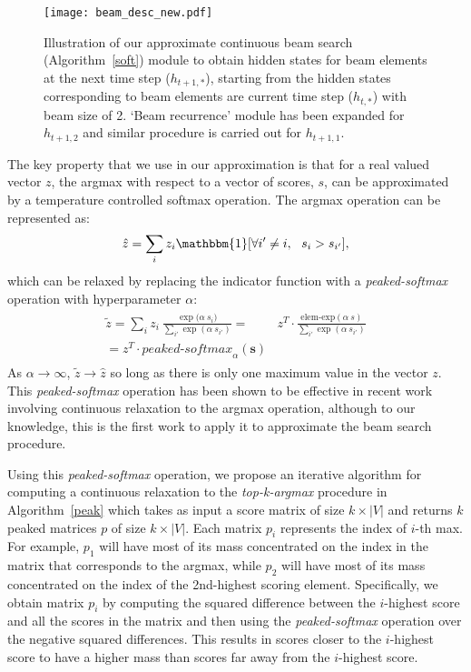 \documentclass[letterpaper]{article} %
\begin{document}
\begin{figure*}[t]
\centering
\texttt{[image: beam\_desc\_new.pdf]}
  \label{figmodel}
  \caption{Illustration of our approximate continuous beam search (Algorithm~\ref{soft}) module to obtain hidden states for beam elements at the next time step (${h_{t+1,*}}$), starting from the hidden states corresponding to beam elements are current time step ($h_{t,*}$) with beam size of 2. `Beam recurrence' module has been expanded for $h_{t+1,2}$ and similar procedure is carried out for $h_{t+1,1}$.}
\end{figure*}
The key property that we use in our approximation is that for a real valued vector $z$, the argmax with respect to a vector of scores, $s$, can be approximated by a temperature controlled softmax operation. The argmax operation can be represented as:
\begin{align*}
    \hat{z} = \sum_i z_i\mathbbm{1}[\forall i' \ne i,\ \ s_i > s_{i'}],
\end{align*}
which can be relaxed by replacing the indicator function with a \emph{peaked-softmax} operation with hyperparameter $\alpha$:
\begin{align*}
 \begin{split}
    \tilde{z} = \sum_i z_i~ \frac{\exp{(\alpha~ s_i})}{\sum_{i'} \exp{(\alpha~ s_{i'})}} = & z^T \cdot \frac{\textrm{elem-exp}(\alpha~ s)}{\sum_{i'} \exp{(\alpha~ s_{i'})}}\\= z^T \cdot \textit{peaked-softmax}_{\alpha}(\mathbf{s})
 \end{split}
\end{align*}
As $\alpha \to \infty$, $\tilde{z} \to \hat{z}$ so long as there is only one maximum value in the vector $z$. This \emph{peaked-softmax} operation has been shown to be effective in recent work \cite{maddison2016concrete,jang2016categorical,softgreedy} involving continuous relaxation to the argmax operation, although to our knowledge, this is the first work to apply it to approximate the beam search procedure. 

Using this \emph{peaked-softmax} operation, we propose an iterative algorithm for computing a continuous relaxation to the \textit{top-k-argmax} procedure in Algorithm~\ref{peak} which takes as input a score matrix of size $k\times |V|$ and returns $k$ peaked matrices $p$ of size $k \times |V|$. Each matrix $p_{i}$ represents the index of $i$-th max. For example, $p_1$ will have most of its mass concentrated on the index in the matrix that corresponds to the argmax, while $p_2$ will have most of its mass concentrated on the index of the 2nd-highest scoring element. Specifically, we obtain matrix $p_i$ by computing the squared difference between the $i$-highest score and all the scores in the matrix and then using the \emph{peaked-softmax} operation over the negative squared differences. This results in scores closer to the $i$-highest score to have a higher mass than scores far away from the $i$-highest score.
\end{document}
